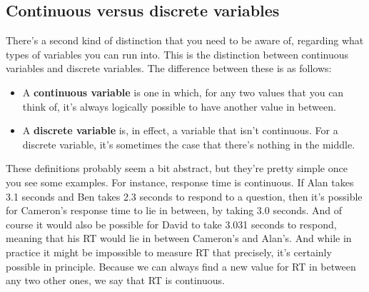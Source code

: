 \documentclass[]{book}
\begin{document}
\hypertarget{continuous-versus-discrete-variables}{%
\subsection{Continuous versus discrete variables}\label{continuous-versus-discrete-variables}}

There's a second kind of distinction that you need to be aware of, regarding what types of variables you can run into. This is the distinction between continuous variables and discrete variables. The difference between these is as follows:

\begin{itemize}
\item
  A \textbf{continuous variable} is one in which, for any two values that you can think of, it's always logically possible to have another value in between.
\item
  A \textbf{discrete variable} is, in effect, a variable that isn't continuous. For a discrete variable, it's sometimes the case that there's nothing in the middle.
\end{itemize}

These definitions probably seem a bit abstract, but they're pretty simple once you see some examples. For instance, response time is continuous. If Alan takes 3.1 seconds and Ben takes 2.3 seconds to respond to a question, then it's possible for Cameron's response time to lie in between, by taking 3.0 seconds. And of course it would also be possible for David to take 3.031 seconds to respond, meaning that his RT would lie in between Cameron's and Alan's. And while in practice it might be impossible to measure RT that precisely, it's certainly possible in principle. Because we can always find a new value for RT in between any two other ones, we say that RT is continuous.
\end{document}
